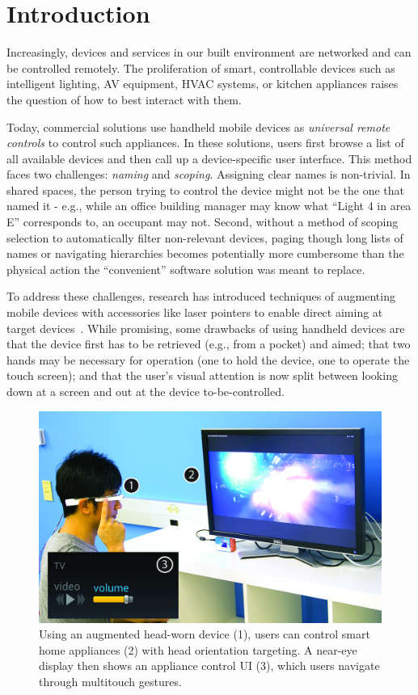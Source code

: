 \section{Introduction}
Increasingly, devices and services in our built environment are networked and can be controlled remotely. The proliferation of smart, controllable devices such as intelligent lighting, AV equipment, HVAC systems, or kitchen appliances raises the question of how to best interact with them. 

Today, commercial solutions use handheld mobile devices as {\em universal remote controls} to control such appliances. In these solutions, users first browse a list of all available devices and then call up a device-specific user interface. This method faces two challenges: {\em naming} and {\em scoping}. Assigning clear names is non-trivial. In shared spaces, the person trying to control the device might not be the one that named it - e.g., while an office building manager may know what ``Light 4 in area E'' corresponds to, an occupant may not. Second, without a method of scoping selection to automatically filter non-relevant devices, paging though long lists of names or navigating hierarchies becomes potentially more cumbersome than the physical action the ``convenient'' software solution was meant to replace.

To address these challenges, research has introduced techniques of augmenting mobile devices with accessories like laser pointers to enable direct aiming at target devices~\cite{beigl_point_1999,patel_2-way_2003}. While promising, some drawbacks of using handheld devices are that the device first has to be retrieved (e.g., from a pocket) and aimed; that two hands may be necessary for operation (one to hold the device, one to operate the touch screen); and that the user's visual attention is now split between looking down at a screen and out at the device to-be-controlled. 

\begin{figure}[t]
\centering
\includegraphics[width=1.0\columnwidth]{figures/teaser.jpg}
\caption{Using an augmented head-worn device (1), users can control smart home appliances (2) with head orientation targeting. A near-eye display then shows an appliance control UI (3), which users navigate through multitouch gestures.}
\label{fig:teaser}
\end{figure}

